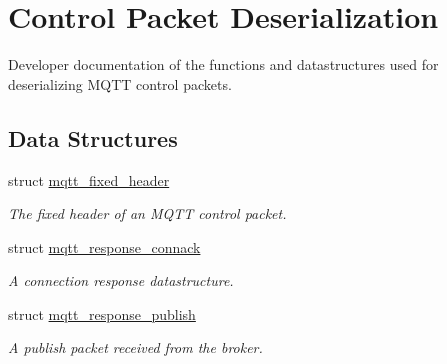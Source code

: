 \hypertarget{group__unpackers}{}\section{Control Packet Deserialization}
\label{group__unpackers}


Developer documentation of the functions and datastructures used for deserializing M\+Q\+TT control packets.  


\subsection*{Data Structures}
\begin{DoxyCompactItemize}
\item 
struct \hyperlink{structmqtt__fixed__header}{mqtt\+\_\+fixed\+\_\+header}
\begin{DoxyCompactList}\small\item\em The fixed header of an M\+Q\+TT control packet. \end{DoxyCompactList}\item 
struct \hyperlink{structmqtt__response__connack}{mqtt\+\_\+response\+\_\+connack}
\begin{DoxyCompactList}\small\item\em A connection response datastructure. \end{DoxyCompactList}\item 
struct \hyperlink{structmqtt__response__publish}{mqtt\+\_\+response\+\_\+publish}
\begin{DoxyCompactList}\small\item\em A publish packet received from the broker.


\end{DoxyCompactList}
\end{DoxyCompactItemize}
